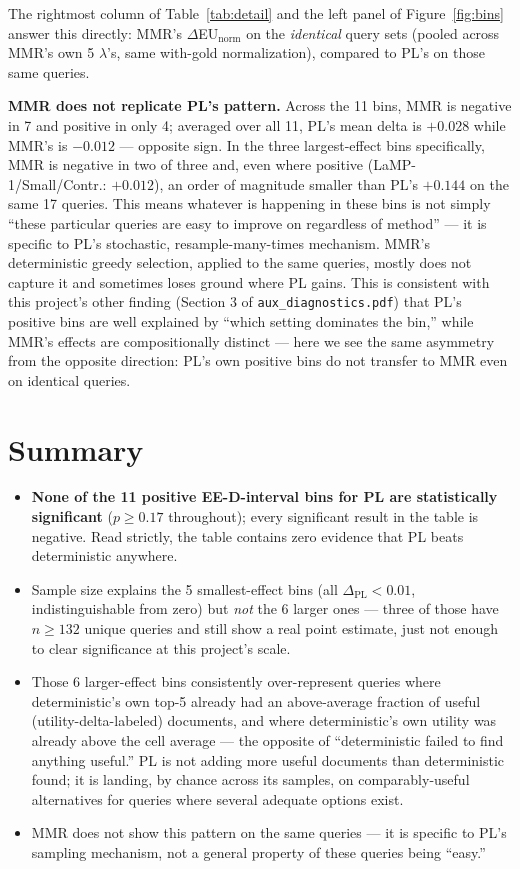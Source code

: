 \documentclass[10pt]{article}
\begin{document}
The rightmost column of Table~\ref{tab:detail} and the left panel of
Figure~\ref{fig:bins} answer this directly: MMR's $\Delta$EU$_{\text{norm}}$ on the
\emph{identical} query sets (pooled across MMR's own 5 $\lambda$'s, same
with-gold normalization), compared to PL's on those same queries.

\textbf{MMR does not replicate PL's pattern.} Across the 11 bins, MMR is negative
in 7 and positive in only 4; averaged over all 11, PL's mean delta is $+0.028$
while MMR's is $-0.012$ --- opposite sign. In the three largest-effect bins
specifically, MMR is negative in two of three and, even where positive
(LaMP-1/Small/Contr.: $+0.012$), an order of magnitude smaller than PL's $+0.144$
on the same 17 queries. This means whatever is happening in these bins is not
simply ``these particular queries are easy to improve on regardless of method''
--- it is specific to PL's stochastic, resample-many-times mechanism. MMR's
deterministic greedy selection, applied to the same queries, mostly does not
capture it and sometimes loses ground where PL gains. This is consistent with
this project's other finding (Section 3 of \texttt{aux\_diagnostics.pdf}) that
PL's positive bins are well explained by ``which setting dominates the bin,''
while MMR's effects are compositionally distinct --- here we see the same
asymmetry from the opposite direction: PL's own positive bins do not transfer to
MMR even on identical queries.

\FloatBarrier
\section{Summary}
\label{sec:summary}

\begin{itemize}
  \item \textbf{None of the 11 positive EE-D-interval bins for PL are
    statistically significant} ($p\geq0.17$ throughout); every significant result
    in the table is negative. Read strictly, the table contains zero evidence
    that PL beats deterministic anywhere.
  \item Sample size explains the 5 smallest-effect bins (all $\Delta_{\text{PL}}{<}0.01$,
    indistinguishable from zero) but \emph{not} the 6 larger ones --- three of
    those have $n{\geq}132$ unique queries and still show a real point estimate,
    just not enough to clear significance at this project's scale.
  \item Those 6 larger-effect bins consistently over-represent queries where
    deterministic's own top-5 already had an above-average fraction of useful
    (utility-delta-labeled) documents, and where deterministic's own utility was
    already above the cell average --- the opposite of ``deterministic failed to
    find anything useful.'' PL is not adding more useful documents than
    deterministic found; it is landing, by chance across its samples, on
    comparably-useful alternatives for queries where several adequate options
    exist.
  \item MMR does not show this pattern on the same queries --- it is specific to
    PL's sampling mechanism, not a general property of these queries being
    ``easy.''
\end{itemize}
\end{document}
